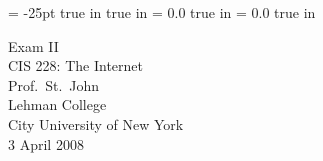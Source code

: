 \pagestyle{empty}
\topmargin= -25pt
 true in
 true in
\oddsidemargin = 0.0 true in
\evensidemargin = 0.0 true in
\newcommand{\ul}{\underline}
\newcommand{\spa}{\hspace{.25in}}


{\large
\begin{center}
    Exam II\\
    CIS 228: The Internet \\
    Prof.~St.~John\\ 
    Lehman College\\
    City University of New York\\ 
    3 April 2008
\end{center}
}


